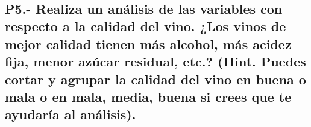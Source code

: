 \documentclass[11pt]{article}
\begin{document}
    \begin{center}
    \end{center}
    { \hspace*{\fill} \\}
    
    \hypertarget{p5.--realiza-un-anuxe1lisis-de-las-variables-con-respecto-a-la-calidad-del-vino.-los-vinos-de-mejor-calidad-tienen-muxe1s-alcohol-muxe1s-acidez-fija-menor-azuxfacar-residual-etc.-hint.-puedes-cortar-y-agrupar-la-calidad-del-vino-en-buena-o-mala-o-en-mala-media-buena-si-crees-que-te-ayudaruxeda-al-anuxe1lisis.}{%
\subsection{P5.- Realiza un análisis de las variables con respecto a la
calidad del vino. ¿Los vinos de mejor calidad tienen más alcohol, más
acidez fija, menor azúcar residual, etc.? (Hint. Puedes cortar y agrupar
la calidad del vino en buena o mala o en mala, media, buena si crees que
te ayudaría al
análisis).}\label{p5.--realiza-un-anuxe1lisis-de-las-variables-con-respecto-a-la-calidad-del-vino.-los-vinos-de-mejor-calidad-tienen-muxe1s-alcohol-muxe1s-acidez-fija-menor-azuxfacar-residual-etc.-hint.-puedes-cortar-y-agrupar-la-calidad-del-vino-en-buena-o-mala-o-en-mala-media-buena-si-crees-que-te-ayudaruxeda-al-anuxe1lisis.}}
\end{document}
